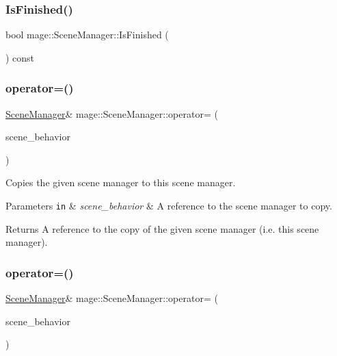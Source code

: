 \subsubsection{\texorpdfstring{Is\+Finished()}{IsFinished()}}
{\footnotesize\ttfamily bool mage\+::\+Scene\+Manager\+::\+Is\+Finished (\begin{DoxyParamCaption}{ }\end{DoxyParamCaption}) const\hspace{0.3cm}{\ttfamily [noexcept]}}

\hypertarget{classmage_1_1_scene_manager_a90c17a35f737879fa07acb28f6d787af}{}\label{classmage_1_1_scene_manager_a90c17a35f737879fa07acb28f6d787af} 
\subsubsection{\texorpdfstring{operator=()}{operator=()}\hspace{0.1cm}{\footnotesize\ttfamily [1/2]}}
{\footnotesize\ttfamily \hyperlink{classmage_1_1_scene_manager}{Scene\+Manager}\& mage\+::\+Scene\+Manager\+::operator= (\begin{DoxyParamCaption}\item[{const \hyperlink{classmage_1_1_scene_manager}{Scene\+Manager} \&}]{scene\+\_\+behavior }\end{DoxyParamCaption})\hspace{0.3cm}{\ttfamily [delete]}}

Copies the given scene manager to this scene manager.


\begin{DoxyParams}[1]{Parameters}
\mbox{\tt in}  & {\em scene\+\_\+behavior} & A reference to the scene manager to copy. \\
\hline
\end{DoxyParams}
\begin{DoxyReturn}{Returns}
A reference to the copy of the given scene manager (i.\+e. this scene manager). 
\end{DoxyReturn}
\hypertarget{classmage_1_1_scene_manager_a5f2e494edeb329e54a928a1bc0f5f7df}{}\label{classmage_1_1_scene_manager_a5f2e494edeb329e54a928a1bc0f5f7df} 
\subsubsection{\texorpdfstring{operator=()}{operator=()}\hspace{0.1cm}{\footnotesize\ttfamily [2/2]}}
{\footnotesize\ttfamily \hyperlink{classmage_1_1_scene_manager}{Scene\+Manager}\& mage\+::\+Scene\+Manager\+::operator= (\begin{DoxyParamCaption}\item[{\hyperlink{classmage_1_1_scene_manager}{Scene\+Manager} \&\&}]{scene\+\_\+behavior }\end{DoxyParamCaption})\hspace{0.3cm}{\ttfamily [delete]}}

